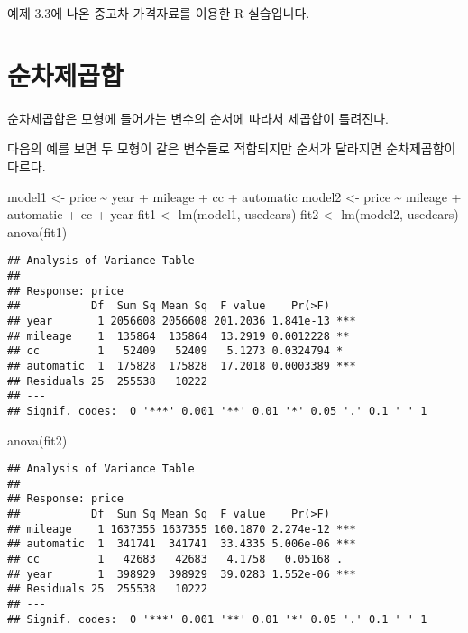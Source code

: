 \documentclass[
]{book}
\newenvironment{Shaded}{\begin{snugshade}}{\end{snugshade}}
\newcommand{\FunctionTok}[1]{\textcolor[rgb]{0.00,0.00,0.00}{#1}}
\newcommand{\NormalTok}[1]{#1}
\newcommand{\OtherTok}[1]{\textcolor[rgb]{0.56,0.35,0.01}{#1}}
\newcommand{\SpecialCharTok}[1]{\textcolor[rgb]{0.00,0.00,0.00}{#1}}
\begin{document}
예제 3.3에 나온 중고차 가격자료를 이용한 R 실습입니다.

\hypertarget{uxc21cuxcc28uxc81cuxacf1uxd569}{%
\section{순차제곱합}\label{uxc21cuxcc28uxc81cuxacf1uxd569}}

순차제곱합은 모형에 들어가는 변수의 순서에 따라서 제곱합이 틀려진다.

다음의 예를 보면 두 모형이 같은 변수들로 적합되지만 순서가 달라지면 순차제곱합이 다르다.

\begin{Shaded}
\begin{Highlighting}[]
\NormalTok{model1 }\OtherTok{\textless{}{-}}\NormalTok{ price }\SpecialCharTok{\textasciitilde{}}\NormalTok{ year }\SpecialCharTok{+}\NormalTok{ mileage }\SpecialCharTok{+}\NormalTok{ cc }\SpecialCharTok{+}\NormalTok{ automatic}
\NormalTok{model2 }\OtherTok{\textless{}{-}}\NormalTok{ price }\SpecialCharTok{\textasciitilde{}}\NormalTok{ mileage }\SpecialCharTok{+}\NormalTok{ automatic }\SpecialCharTok{+}\NormalTok{ cc }\SpecialCharTok{+}\NormalTok{ year}
\NormalTok{fit1 }\OtherTok{\textless{}{-}} \FunctionTok{lm}\NormalTok{(model1, usedcars)}
\NormalTok{fit2 }\OtherTok{\textless{}{-}} \FunctionTok{lm}\NormalTok{(model2, usedcars)}
\FunctionTok{anova}\NormalTok{(fit1)}
\end{Highlighting}
\end{Shaded}

\begin{verbatim}
## Analysis of Variance Table
## 
## Response: price
##           Df  Sum Sq Mean Sq  F value    Pr(>F)    
## year       1 2056608 2056608 201.2036 1.841e-13 ***
## mileage    1  135864  135864  13.2919 0.0012228 ** 
## cc         1   52409   52409   5.1273 0.0324794 *  
## automatic  1  175828  175828  17.2018 0.0003389 ***
## Residuals 25  255538   10222                       
## ---
## Signif. codes:  0 '***' 0.001 '**' 0.01 '*' 0.05 '.' 0.1 ' ' 1
\end{verbatim}

\begin{Shaded}
\begin{Highlighting}[]
\FunctionTok{anova}\NormalTok{(fit2)}
\end{Highlighting}
\end{Shaded}

\begin{verbatim}
## Analysis of Variance Table
## 
## Response: price
##           Df  Sum Sq Mean Sq  F value    Pr(>F)    
## mileage    1 1637355 1637355 160.1870 2.274e-12 ***
## automatic  1  341741  341741  33.4335 5.006e-06 ***
## cc         1   42683   42683   4.1758   0.05168 .  
## year       1  398929  398929  39.0283 1.552e-06 ***
## Residuals 25  255538   10222                       
## ---
## Signif. codes:  0 '***' 0.001 '**' 0.01 '*' 0.05 '.' 0.1 ' ' 1
\end{verbatim}
\end{document}
